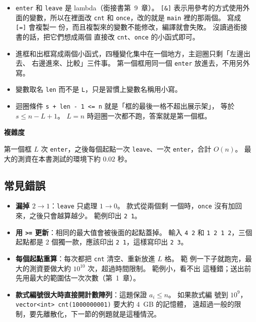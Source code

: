 
\begin{itemize}
\item \texttt{enter} 和 \texttt{leave} 是 lambda（銜接書第~9~章）。
\texttt{[\&]} 表示用參考的方式使用外面的變數，所以在裡面改 \texttt{cnt} 和
\texttt{once}，改的就是 \texttt{main} 裡的那兩個。 寫成 \texttt{[=]} 會複製一
份，而且複製來的變數不能修改，編譯就會失敗。 沒讀過銜接書的話，把它們想成兩個
直接改 \texttt{cnt}、\texttt{once} 的小函式即可。
\item 進框和出框寫成兩個小函式，四種變化集中在一個地方，主迴圈只剩「左邊出去、
右邊進來、比較」三件事。 第一個框用同一個 \texttt{enter} 放進去，不用另外寫。
\item 變數取名 \texttt{len} 而不是 \texttt{L}，只是習慣上變數名稱用小寫。
\item 迴圈條件 \texttt{s + len - 1 <= n} 就是「框的最後一格不超出展示架」，
等於 $s \le n - L + 1$。 $L = n$ 時迴圈一次都不跑，答案就是第一個框。
\end{itemize}

\textbf{複雜度}

第一個框 $L$ 次 \texttt{enter}，之後每個起點一次 \texttt{leave}、一次
\texttt{enter}，合計 $O(n)$。 最大的測資在本書測試的環境下約 $0.02$ 秒。

\subsection{常見錯誤}

\begin{itemize}
\item \textbf{漏掉 $2 \to 1$}：\texttt{leave} 只處理 $1 \to 0$。 款式從兩個剩
一個時，\texttt{once} 沒有加回來，之後只會越算越少。 範例印出 \texttt{2 1}。
\item \textbf{用 \texttt{>=} 更新}：相同的最大值會被後面的起點蓋掉。 輸入
\texttt{4 2} 和 \texttt{1 2 1 2}，三個起點都是 $2$ 個獨一款，應該印出
\texttt{2 1}，這樣寫印出 \texttt{2 3}。
\item \textbf{每個起點重算}：每次都把 \texttt{cnt} 清空、重新放進 $L$ 格。 範
例一下子就跑完，最大的測資要做大約 $10^{10}$ 次，超過時間限制。 範例小，看不出
這種錯；送出前先用最大的範圍估一次次數（第~1~章）。
\item \textbf{款式編號很大時直接開計數陣列}：這題保證 $a_i \le n$。 如果款式編
號到 $10^9$，\texttt{vector<int> cnt(1000000001)} 要大約 $4$~GB 的記憶體，
遠超過一般的限制，要先離散化，下一節的例題就是這種情況。
\end{itemize}

